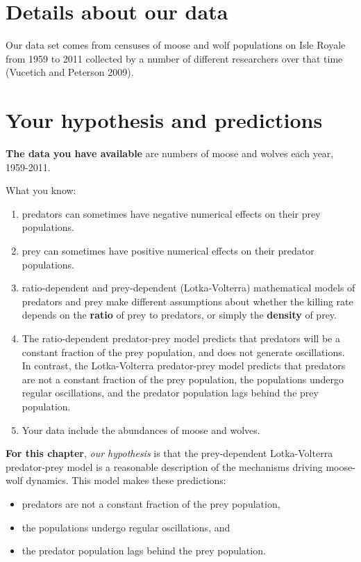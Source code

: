 \documentclass[
  letterpaper,
  DIV=11,
  numbers=noendperiod]{scrreprt}
\providecommand{\tightlist}{%
  \setlength{\itemsep}{0pt}\setlength{\parskip}{0pt}}
\begin{document}
\section{Details about our data}\label{details-about-our-data}

Our data set comes from censuses of moose and wolf populations on Isle
Royale from 1959 to 2011 collected by a number of different researchers
over that time (Vucetich and Peterson 2009).

\section{Your hypothesis and
predictions}\label{your-hypothesis-and-predictions-1}

\textbf{The data you have available} are numbers of moose and wolves
each year, 1959-2011.

What you know:

\begin{enumerate}
\def\labelenumi{\arabic{enumi}.}
\tightlist
\item
  predators can sometimes have negative numerical effects on their prey
  populations.
\item
  prey can sometimes have positive numerical effects on their predator
  populations.
\item
  ratio-dependent and prey-dependent (Lotka-Volterra) mathematical
  models of predators and prey make different assumptions about whether
  the killing rate depends on the \textbf{ratio} of prey to predators,
  or simply the \textbf{density} of prey.
\item
  The ratio-dependent predator-prey model predicts that predators will
  be a constant fraction of the prey population, and does not generate
  oscillations. In contrast, the Lotka-Volterra predator-prey model
  predicts that predators are not a constant fraction of the prey
  population, the populations undergo regular oscillations, and the
  predator population lags behind the prey population.
\item
  Your data include the abundances of moose and wolves.
\end{enumerate}

\textbf{For this chapter}, \emph{our hypothesis} is that the
prey-dependent Lotka-Volterra predator-prey model is a reasonable
description of the mechanisms driving moose-wolf dynamics. This model
makes these predictions:

\begin{itemize}
\tightlist
\item
  predators are not a constant fraction of the prey population,
\item
  the populations undergo regular oscillations, and
\item
  the predator population lags behind the prey population.
\end{itemize}
\end{document}
